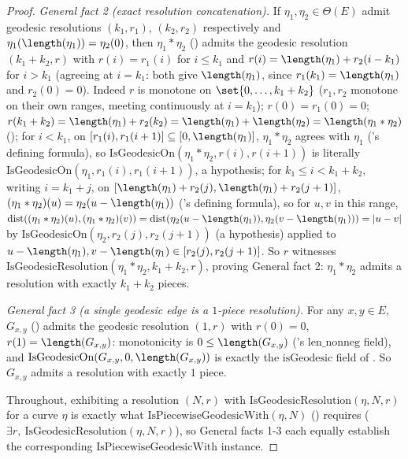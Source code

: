 \begin{proof}
  \emph{General fact 2 (exact resolution concatenation).} If $\eta_1,\eta_2 \in \Theta(E)$ admit
  geodesic resolutions $(k_1,r_1)$, $(k_2,r_2)$ respectively and $\eta_1(\length(\eta_1)) =
  \eta_2(0)$, then $\eta_1 * \eta_2$ () admits the geodesic resolution
  $(k_1+k_2,r)$ with $r(i)=r_1(i)$ for $i\le k_1$ and $r(i) = \length(\eta_1)+r_2(i-k_1)$ for
  $i>k_1$ (agreeing at $i=k_1$: both give $\length(\eta_1)$, since $r_1(k_1)=\length(\eta_1)$ and
  $r_2(0)=0$). Indeed $r$ is monotone on $\set{0,\dots,k_1+k_2}$ ($r_1,r_2$ monotone on their own
  ranges, meeting continuously at $i=k_1$); $r(0)=r_1(0)=0$; $r(k_1+k_2) = \length(\eta_1)+r_2(k_2) =
  \length(\eta_1)+\length(\eta_2) = \length(\eta_1*\eta_2)$ (); for $i<k_1$, on
  $[r_1(i),r_1(i+1)]\subseteq[0,\length(\eta_1)]$, $\eta_1*\eta_2$ agrees with $\eta_1$
  ('s defining formula), so $\mathrm{IsGeodesicOn}(\eta_1*\eta_2,r(i),r(i+1))$
  is literally $\mathrm{IsGeodesicOn}(\eta_1,r_1(i),r_1(i+1))$, a hypothesis; for $k_1\le i<k_1+k_2$,
  writing $i=k_1+j$, on $[\length(\eta_1)+r_2(j),\length(\eta_1)+r_2(j+1)]$,
  $(\eta_1*\eta_2)(u)=\eta_2(u-\length(\eta_1))$ ('s defining formula), so for
  $u,v$ in this range, $\mathrm{dist}((\eta_1*\eta_2)(u),(\eta_1*\eta_2)(v)) =
  \mathrm{dist}(\eta_2(u-\length(\eta_1)),\eta_2(v-\length(\eta_1))) = |u-v|$ by
  $\mathrm{IsGeodesicOn}(\eta_2,r_2(j),r_2(j+1))$ (a hypothesis) applied to
  $u-\length(\eta_1),v-\length(\eta_1)\in[r_2(j),r_2(j+1)]$. So $r$ witnesses
  $\mathrm{IsGeodesicResolution}(\eta_1*\eta_2,k_1+k_2,r)$, proving General fact 2: $\eta_1*\eta_2$
  admits a resolution with exactly $k_1+k_2$ pieces.

  \emph{General fact 3 (a single geodesic edge is a $1$-piece resolution).} For any $x,y\in E$,
  $G_{x,y}$ () admits the geodesic resolution $(1,r)$ with $r(0)=0$,
  $r(1)=\length(G_{x,y})$: monotonicity is $0\le\length(G_{x,y})$ ('s
  $\mathrm{len\_nonneg}$ field), and $\mathrm{IsGeodesicOn}(G_{x,y},0,\length(G_{x,y}))$ is exactly
  the $\mathrm{isGeodesic}$ field of . So $G_{x,y}$ admits a resolution with
  exactly $1$ piece.

  Throughout, exhibiting a resolution $(N,r)$ with $\mathrm{IsGeodesicResolution}(\eta,N,r)$ for a
  curve $\eta$ is exactly what $\mathrm{IsPiecewiseGeodesicWith}(\eta,N)$
  () requires ($\exists r,\ \mathrm{IsGeodesicResolution}(\eta,N,r)$),
  so General facts 1-3 each equally establish the corresponding
  $\mathrm{IsPiecewiseGeodesicWith}$ instance.


\end{proof}
